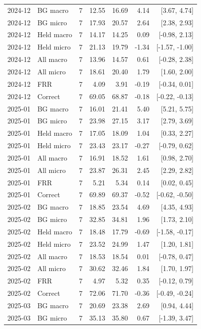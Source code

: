 \begin{longtable}{llrrrrr}
2024-12 & BG macro & 7 & 12.55 & 16.69 & 4.14 & [3.67, 4.74]\\
2024-12 & BG micro & 7 & 17.93 & 20.57 & 2.64 & [2.38, 2.93]\\
2024-12 & Held macro & 7 & 14.17 & 14.25 & 0.09 & [-0.98, 2.13]\\
2024-12 & Held micro & 7 & 21.13 & 19.79 & -1.34 & [-1.57, -1.00]\\
2024-12 & All macro & 7 & 13.96 & 14.57 & 0.61 & [-0.28, 2.38]\\
2024-12 & All micro & 7 & 18.61 & 20.40 & 1.79 & [1.60, 2.00]\\
2024-12 & FRR & 7 & 4.09 & 3.91 & -0.19 & [-0.34, 0.01]\\
2024-12 & Correct & 7 & 69.05 & 68.87 & -0.18 & [-0.22, -0.13]\\
2025-01 & BG macro & 7 & 16.01 & 21.41 & 5.40 & [5.21, 5.75]\\
2025-01 & BG micro & 7 & 23.98 & 27.15 & 3.17 & [2.79, 3.69]\\
2025-01 & Held macro & 7 & 17.05 & 18.09 & 1.04 & [0.33, 2.27]\\
2025-01 & Held micro & 7 & 23.43 & 23.17 & -0.27 & [-0.79, 0.62]\\
2025-01 & All macro & 7 & 16.91 & 18.52 & 1.61 & [0.98, 2.70]\\
2025-01 & All micro & 7 & 23.87 & 26.31 & 2.45 & [2.29, 2.82]\\
2025-01 & FRR & 7 & 5.21 & 5.34 & 0.14 & [0.02, 0.45]\\
2025-01 & Correct & 7 & 69.89 & 69.37 & -0.52 & [-0.62, -0.50]\\
2025-02 & BG macro & 7 & 18.85 & 23.54 & 4.69 & [4.35, 4.93]\\
2025-02 & BG micro & 7 & 32.85 & 34.81 & 1.96 & [1.73, 2.10]\\
2025-02 & Held macro & 7 & 18.48 & 17.79 & -0.69 & [-1.58, -0.17]\\
2025-02 & Held micro & 7 & 23.52 & 24.99 & 1.47 & [1.20, 1.81]\\
2025-02 & All macro & 7 & 18.53 & 18.54 & 0.01 & [-0.78, 0.47]\\
2025-02 & All micro & 7 & 30.62 & 32.46 & 1.84 & [1.70, 1.97]\\
2025-02 & FRR & 7 & 4.97 & 5.32 & 0.35 & [-0.12, 0.79]\\
2025-02 & Correct & 7 & 72.06 & 71.70 & -0.36 & [-0.49, -0.24]\\
2025-03 & BG macro & 7 & 20.69 & 23.38 & 2.69 & [0.94, 4.44]\\
2025-03 & BG micro & 7 & 35.13 & 35.80 & 0.67 & [-1.39, 3.47]\\

\end{longtable}
